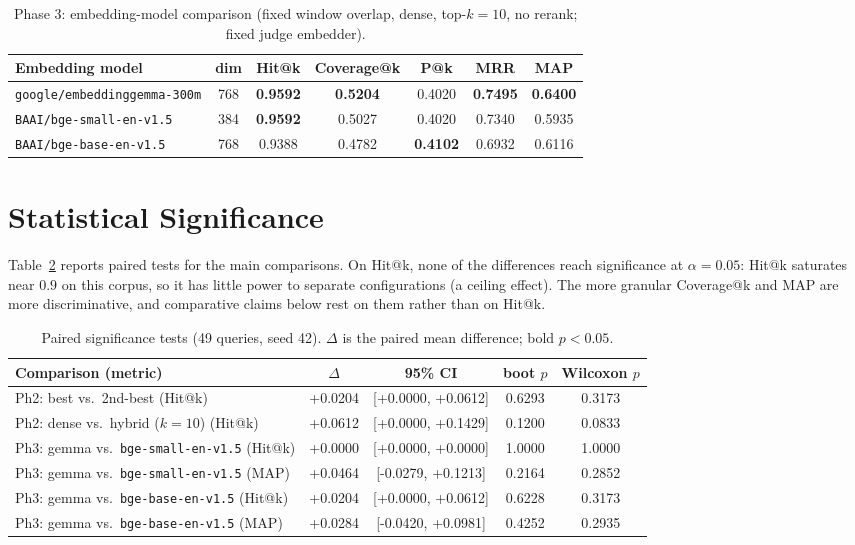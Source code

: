 \documentclass[12pt,a4paper,titlepage,oneside]{book}
\begin{document}
\begin{table}[htbp]
\centering
\caption{Phase 3: embedding-model comparison (fixed window overlap, dense, top-$k=10$, no rerank; fixed judge embedder).}
\label{tab:phase3}
\begin{tabular}{lcccccc}
\toprule
Embedding model & dim & Hit@k & Coverage@k & P@k & MRR & MAP \\
\midrule
\texttt{google/embeddinggemma-300m} & 768 & \textbf{0.9592} & \textbf{0.5204} & 0.4020 & \textbf{0.7495} & \textbf{0.6400} \\
\texttt{BAAI/bge-small-en-v1.5} & 384 & \textbf{0.9592} & 0.5027 & 0.4020 & 0.7340 & 0.5935 \\
\texttt{BAAI/bge-base-en-v1.5} & 768 & 0.9388 & 0.4782 & \textbf{0.4102} & 0.6932 & 0.6116 \\
\bottomrule
\end{tabular}
\end{table}

\section{Statistical Significance}
Table~\ref{tab:significance} reports paired tests for the main comparisons. On Hit@k, none of the differences reach significance at $\alpha=0.05$: Hit@k saturates near $0.9$ on this corpus, so it has little power to separate configurations (a ceiling effect). The more granular Coverage@k and MAP are more discriminative, and comparative claims below rest on them rather than on Hit@k.

\begin{table}[htbp]
\centering
\caption{Paired significance tests (49 queries, seed 42). $\Delta$ is the paired mean difference; bold $p<0.05$.}
\label{tab:significance}
\begin{tabular}{lcccc}
\toprule
Comparison (metric) & $\Delta$ & 95\% CI & boot $p$ & Wilcoxon $p$ \\
\midrule
Ph2: best vs.\ 2nd-best (Hit@k) & +0.0204 & [+0.0000, +0.0612] & 0.6293 & 0.3173 \\
Ph2: dense vs.\ hybrid ($k{=}10$) (Hit@k) & +0.0612 & [+0.0000, +0.1429] & 0.1200 & 0.0833 \\
Ph3: gemma vs.\ \texttt{bge-small-en-v1.5} (Hit@k) & +0.0000 & [+0.0000, +0.0000] & 1.0000 & 1.0000 \\
Ph3: gemma vs.\ \texttt{bge-small-en-v1.5} (MAP) & +0.0464 & [-0.0279, +0.1213] & 0.2164 & 0.2852 \\
Ph3: gemma vs.\ \texttt{bge-base-en-v1.5} (Hit@k) & +0.0204 & [+0.0000, +0.0612] & 0.6228 & 0.3173 \\
Ph3: gemma vs.\ \texttt{bge-base-en-v1.5} (MAP) & +0.0284 & [-0.0420, +0.0981] & 0.4252 & 0.2935 \\
\bottomrule
\end{tabular}
\end{table}
\end{document}
